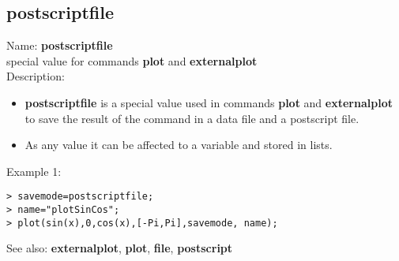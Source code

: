 \subsection{ postscriptfile }
\noindent Name: \textbf{postscriptfile}\\
special value for commands \textbf{plot} and \textbf{externalplot}\\

\noindent Description: \begin{itemize}

\item \textbf{postscriptfile} is a special value used in commands \textbf{plot} and \textbf{externalplot} to save
   the result of the command in a data file and a postscript file.

\item As any value it can be affected to a variable and stored in lists.
\end{itemize}
\noindent Example 1: 
\begin{center}\begin{minipage}{15cm}\begin{Verbatim}[frame=single]
> savemode=postscriptfile;
> name="plotSinCos";
> plot(sin(x),0,cos(x),[-Pi,Pi],savemode, name);
\end{Verbatim}
\end{minipage}\end{center}
See also: \textbf{externalplot}, \textbf{plot}, \textbf{file}, \textbf{postscript}

